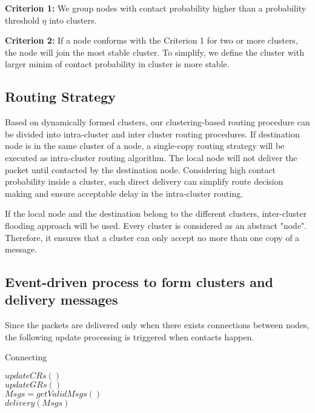  \textbf{Criterion 1:} We group nodes with contact probability higher than a probability threshold $\eta$ into clusters.

  \textbf{Criterion 2:} If a node conforms with the Criterion 1 for two or more clusters, the node will join the most stable cluster. To simplify, we define the cluster with larger minim of contact probability in cluster is more stable.
  
\subsection{Routing Strategy}
 
Based on dynamically formed clusters, our clustering-based routing procedure can be divided into intra-cluster and inter cluster routing procedures. If destination node is in the same cluster of a node, a single-copy routing strategy will be executed as intra-cluster routing algorithm. The local node will not deliver the packet until contacted by the destination node. Considering high contact probability inside a cluster, such direct delivery can simplify route decision making and ensure acceptable delay in the intra-cluster routing.

If the local node and the destination belong to the different clusters, inter-cluster flooding approach will be used. Every cluster is considered as an abstract "node". Therefore, it ensures that a cluster can only accept no more than one copy of a message.

\subsection{Event-driven process to form clusters and delivery messages}

Since the packets are delivered only when there exists connections between nodes, the following update processing is triggered when contacts happen.

\begin{algorithm}[!t]
\caption{Connecting}
\STATE $updateCRs()$\\
\STATE $updateGRs()$\\
\STATE $Msgs = getValidMsgs()$\\
\STATE $delivery(Msgs)$\\
\end{algorithm}

 

